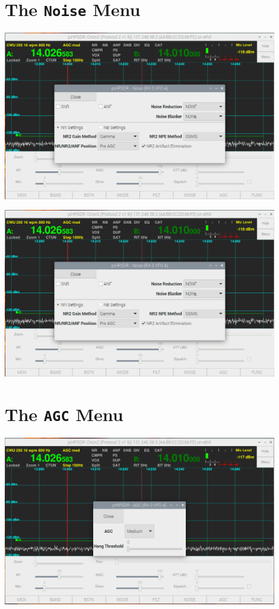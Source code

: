 \documentclass[12pt]{book}
\begin{document}
\section{The \texttt{Noise} Menu}
\begin{center}
\includegraphics[width=12cm]{NoiseMenu1.png}
\end{center}

\begin{center}
\includegraphics[width=12cm]{NoiseMenu1.png}
\end{center}

\section{The \texttt{AGC} Menu}
\begin{center}
\includegraphics[width=12cm]{AGCMenu.png}
\end{center}
\end{document}
